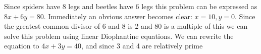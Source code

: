 Since spiders have 8 legs and beetles have 6 legs this problem can be expressed as $8x + 6y = 80$. Immediately an obvious answer becomes clear: $x=10, y=0$. Since the greatest common divisor of 6 and 8 is 2 and 80 is a multiple of this we can solve this problem using linear Diophantine equations. We can rewrite the equation to $4x + 3y = 40$, and since 3 and 4 are relatively prime